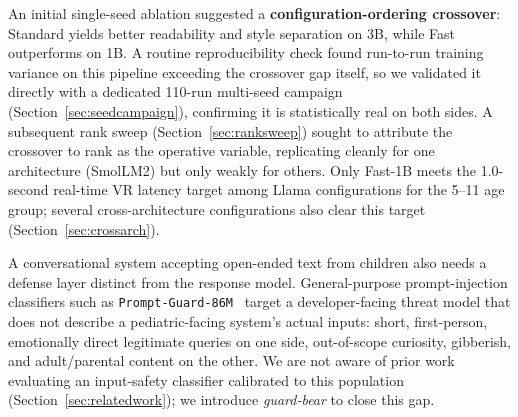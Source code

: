 \documentclass[pdflatex,sn-mathphys-num]{sn-jnl}%
\begin{document}
An initial single-seed ablation suggested a \textbf{configuration-ordering crossover}: Standard yields better readability and style separation on 3B, while Fast outperforms on 1B. A routine reproducibility check found run-to-run training variance on this pipeline exceeding the crossover gap itself, so we validated it directly with a dedicated 110-run multi-seed campaign (Section~\ref{sec:seedcampaign}), confirming it is statistically real on both sides. A subsequent rank sweep (Section~\ref{sec:ranksweep}) sought to attribute the crossover to rank as the operative variable, replicating cleanly for one architecture (SmolLM2) but only weakly for others. Only Fast-1B meets the 1.0-second real-time VR latency target among Llama configurations for the 5--11 age group; several cross-architecture configurations also clear this target (Section~\ref{sec:crossarch}).

A conversational system accepting open-ended text from children also needs a defense layer distinct from the response model. General-purpose prompt-injection classifiers such as \texttt{Prompt-Guard-86M}~\cite{promptguard2024} target a developer-facing threat model that does not describe a pediatric-facing system's actual inputs: short, first-person, emotionally direct legitimate queries on one side, out-of-scope curiosity, gibberish, and adult/parental content on the other. We are not aware of prior work evaluating an input-safety classifier calibrated to this population (Section~\ref{sec:relatedwork}); we introduce \textit{guard-bear} to close this gap.
\end{document}
